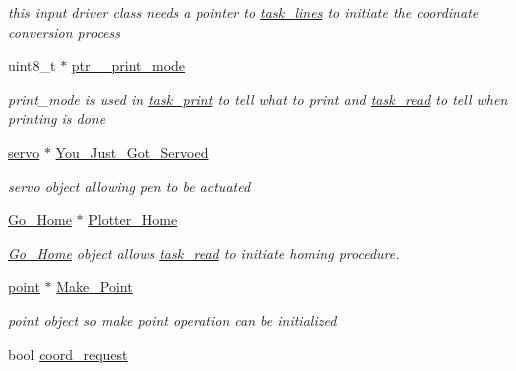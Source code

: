 \begin{DoxyCompactItemize}
\begin{DoxyCompactList}\small\item\em this input driver class needs a pointer to \hyperlink{classtask__lines}{task\-\_\-lines} to initiate the coordinate conversion process \end{DoxyCompactList}\item 
\hypertarget{classtask__read_a3b091755eb7191a9335849186fe0182d}{uint8\-\_\-t $\ast$ \hyperlink{classtask__read_a3b091755eb7191a9335849186fe0182d}{ptr\-\_\-\_\-print\-\_\-mode}}\label{classtask__read_a3b091755eb7191a9335849186fe0182d}

\begin{DoxyCompactList}\small\item\em print\-\_\-mode is used in \hyperlink{classtask__print}{task\-\_\-print} to tell what to print and \hyperlink{classtask__read}{task\-\_\-read} to tell when printing is done \end{DoxyCompactList}\item 
\hypertarget{classtask__read_aa7e34e9247996ada93680d9d8a487d5f}{\hyperlink{classservo}{servo} $\ast$ \hyperlink{classtask__read_aa7e34e9247996ada93680d9d8a487d5f}{You\-\_\-\-Just\-\_\-\-Got\-\_\-\-Servoed}}\label{classtask__read_aa7e34e9247996ada93680d9d8a487d5f}

\begin{DoxyCompactList}\small\item\em servo object allowing pen to be actuated \end{DoxyCompactList}\item 
\hypertarget{classtask__read_a0b170938e3179e2d810ea7f95ae37a75}{\hyperlink{class_go___home}{Go\-\_\-\-Home} $\ast$ \hyperlink{classtask__read_a0b170938e3179e2d810ea7f95ae37a75}{Plotter\-\_\-\-Home}}\label{classtask__read_a0b170938e3179e2d810ea7f95ae37a75}

\begin{DoxyCompactList}\small\item\em \hyperlink{class_go___home}{Go\-\_\-\-Home} object allows \hyperlink{classtask__read}{task\-\_\-read} to initiate homing procedure. \end{DoxyCompactList}\item 
\hypertarget{classtask__read_a9493b50784b9d5077ed9a8994fb1e58d}{\hyperlink{classpoint}{point} $\ast$ \hyperlink{classtask__read_a9493b50784b9d5077ed9a8994fb1e58d}{Make\-\_\-\-Point}}\label{classtask__read_a9493b50784b9d5077ed9a8994fb1e58d}

\begin{DoxyCompactList}\small\item\em point object so make point operation can be initialized \end{DoxyCompactList}\item 
\hypertarget{classtask__read_af36241d1d2487fb0c42e9c7d5d4ad42b}{bool \hyperlink{classtask__read_af36241d1d2487fb0c42e9c7d5d4ad42b}{coord\-\_\-request}}\label{classtask__read_af36241d1d2487fb0c42e9c7d5d4ad42b}


\end{DoxyCompactItemize}
